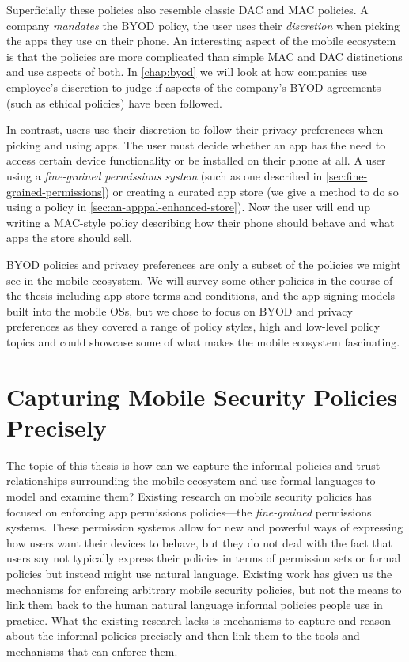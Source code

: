 \documentclass[thesis.tex]{subfiles}
\begin{document}
Superficially these policies also resemble classic \ac{DAC} and \ac{MAC}
policies. A company \emph{mandates} the \ac{BYOD} policy, the user uses
their \emph{discretion} when picking the apps they use on their phone.
An interesting aspect of the mobile ecosystem is that the policies are
more complicated than simple \ac{MAC} and \ac{DAC} distinctions and use aspects
of both.  In \autoref{chap:byod} we will look at how companies use
employee's discretion to judge if aspects of the company's \ac{BYOD}
agreements (such as ethical policies) have been followed.  

In contrast, users use their discretion to follow their privacy
preferences when picking and using apps.  The user must decide whether
an app has the need to access certain device functionality or be
installed on their phone at all.  A user using a \emph{fine-grained
permissions system} (such as one described in
\autoref{sec:fine-grained-permissions}) or creating a curated app
store (we give a method to do so using a policy in
\autoref{sec:an-apppal-enhanced-store}). Now the user will end up
writing a \ac{MAC}-style policy describing how their phone should
behave and what apps the store should sell.

\ac{BYOD} policies and privacy preferences are only a subset of the
policies we might see in the mobile ecosystem.  We will survey some
other policies in the course of the thesis including app store terms
and conditions, and the app signing models built into the mobile OSs,
but we chose to focus on \ac{BYOD} and privacy preferences as they covered
a range of policy styles, high and low-level policy topics and could
showcase some of what makes the mobile ecosystem fascinating.

\section{Capturing Mobile Security Policies Precisely}
\label{sec:methods}

The topic of this thesis is how can we capture the informal policies
and trust relationships surrounding the mobile ecosystem and use
formal languages to model and examine them?  Existing research on
mobile security policies has focused on enforcing app permissions
policies---the \emph{fine-grained} permissions systems.  These
permission systems allow for new and powerful ways of expressing how
users want their devices to behave, but they do not deal with the fact
that users say not typically express their policies in terms of
permission sets or formal policies but instead might use natural
language.  Existing work has given us the mechanisms for enforcing
arbitrary mobile security policies, but not the means to link them
back to the human natural language informal policies people use in
practice.  What the existing research lacks is mechanisms to capture
and reason about the informal policies precisely and then link them to
the tools and mechanisms that can enforce them.
\end{document}
